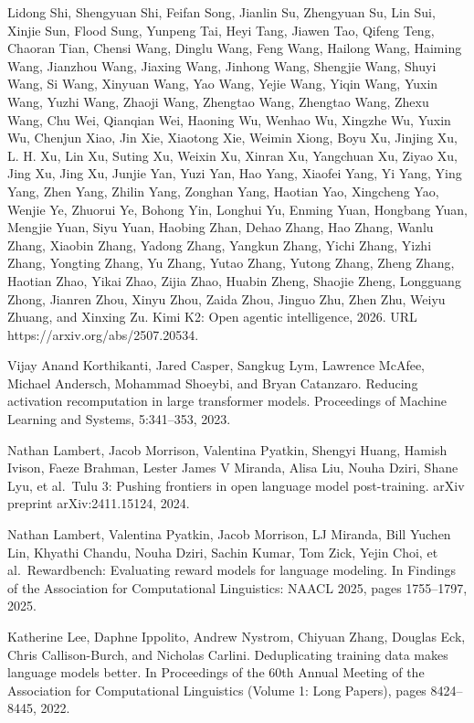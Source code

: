 Lidong Shi, Shengyuan Shi, Feifan Song, Jianlin Su, Zhengyuan Su, Lin
Sui, Xinjie Sun, Flood Sung, Yunpeng Tai, Heyi Tang, Jiawen Tao, Qifeng
Teng, Chaoran Tian, Chensi Wang, Dinglu Wang, Feng Wang, Hailong Wang,
Haiming Wang, Jianzhou Wang, Jiaxing Wang, Jinhong Wang, Shengjie Wang,
Shuyi Wang, Si Wang, Xinyuan Wang, Yao Wang, Yejie Wang, Yiqin Wang,
Yuxin Wang, Yuzhi Wang, Zhaoji Wang, Zhengtao Wang, Zhengtao Wang, Zhexu
Wang, Chu Wei, Qianqian Wei, Haoning Wu, Wenhao Wu, Xingzhe Wu, Yuxin
Wu, Chenjun Xiao, Jin Xie, Xiaotong Xie, Weimin Xiong, Boyu Xu, Jinjing
Xu, L. H. Xu, Lin Xu, Suting Xu, Weixin Xu, Xinran Xu, Yangchuan Xu,
Ziyao Xu, Jing Xu, Jing Xu, Junjie Yan, Yuzi Yan, Hao Yang, Xiaofei
Yang, Yi Yang, Ying Yang, Zhen Yang, Zhilin Yang, Zonghan Yang, Haotian
Yao, Xingcheng Yao, Wenjie Ye, Zhuorui Ye, Bohong Yin, Longhui Yu,
Enming Yuan, Hongbang Yuan, Mengjie Yuan, Siyu Yuan, Haobing Zhan, Dehao
Zhang, Hao Zhang, Wanlu Zhang, Xiaobin Zhang, Yadong Zhang, Yangkun
Zhang, Yichi Zhang, Yizhi Zhang, Yongting Zhang, Yu Zhang, Yutao Zhang,
Yutong Zhang, Zheng Zhang, Haotian Zhao, Yikai Zhao, Zijia Zhao, Huabin
Zheng, Shaojie Zheng, Longguang Zhong, Jianren Zhou, Xinyu Zhou, Zaida
Zhou, Jinguo Zhu, Zhen Zhu, Weiyu Zhuang, and Xinxing Zu. Kimi K2: Open
agentic intelligence, 2026. URL https://arxiv.org/abs/2507.20534.

Vijay Anand Korthikanti, Jared Casper, Sangkug Lym, Lawrence McAfee,
Michael Andersch, Mohammad Shoeybi, and Bryan Catanzaro. Reducing
activation recomputation in large transformer models. Proceedings
of Machine Learning and Systems, 5:341--353, 2023.

Nathan Lambert, Jacob Morrison, Valentina Pyatkin, Shengyi Huang, Hamish
Ivison, Faeze Brahman, Lester James V Miranda, Alisa Liu, Nouha Dziri,
Shane Lyu, et al.~Tulu 3: Pushing frontiers in open language model
post-training. arXiv preprint arXiv:2411.15124, 2024.

Nathan Lambert, Valentina Pyatkin, Jacob Morrison, LJ Miranda, Bill
Yuchen Lin, Khyathi Chandu, Nouha Dziri, Sachin Kumar, Tom Zick, Yejin
Choi, et al.~Rewardbench: Evaluating reward models for language
modeling. In Findings of the Association for Computational Linguistics:
NAACL 2025, pages 1755--1797, 2025.

Katherine Lee, Daphne Ippolito, Andrew Nystrom, Chiyuan Zhang, Douglas
Eck, Chris Callison-Burch, and Nicholas Carlini. Deduplicating training
data makes language models better. In Proceedings of the 60th
Annual Meeting of the Association for Computational Linguistics (Volume 1:
Long Papers), pages 8424--8445, 2022.

